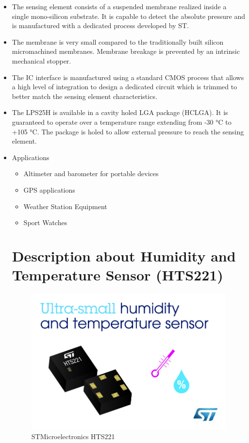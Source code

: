 \documentclass[11pt,a4paper]{article}
\begin{document}
\begin{itemize}
\item The sensing element consists of a suspended
membrane realized inside a single mono-silicon
substrate. It is capable to detect the absolute
pressure and is manufactured with a dedicated
process developed by ST.

\item The membrane is very small compared to the
traditionally built silicon micromachined
membranes. Membrane breakage is prevented
by an intrinsic mechanical stopper.

\item The IC interface is manufactured using a standard
CMOS process that allows a high level of
integration to design a dedicated circuit which is
trimmed to better match the sensing element
characteristics.

\item The LPS25H is available in a cavity holed LGA
package (HCLGA). It is guaranteed to operate
over a temperature range extending from -30 °C
to +105 °C. The package is holed to allow
external pressure to reach the sensing element.

\item Applications
\begin{itemize}
\item Altimeter and barometer for portable devices
\item GPS applications
\item Weather Station Equipment
\item Sport Watches
\end{itemize}


\newpage
\section{Description about Humidity and Temperature Sensor (HTS221)}
\begin{figure}[h]
    \centering
	\includegraphics{HT.jpg}
	\caption {STMicroelectronics HTS221}
	\end{figure}
	

\end{itemize}
\end{document}
